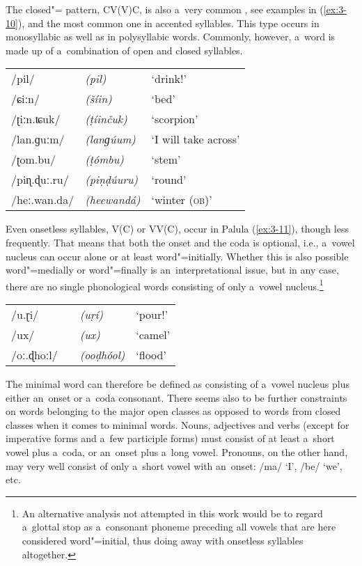 The closed"= pattern, CV(V)C, is also a~very common , see examples in (\ref{ex:3-10}), and the most common one in accented syllables. This type occurs in monosyllabic as well as in polysyllabic words. Commonly, however, a~word is made up of a~combination of open and closed syllables. 


\begin{exe}
\extab
\label{ex:3-10}
\begin{tabular}{ l l l }
/pil/ &
\textit{(pil)} &
`drink!' \\
/ɕiːn/ &
\textit{(\v{s}íin)} &
`bed'\\
/ʈiːn.ʨuk/ &
\textit{(ṭíinčuk)} &
`scorpion'\\
/lan.ɡuːm/ &
\textit{(lanɡúum)} &
`I will take across'\\
/ʈom.bu/ &
\textit{(ṭómbu)} &
`stem'\\
/piɳ.ɖuː.ru/ &
\textit{(piṇḍúuru)} &
`round'\\
/heː.wan.da/ &
\textit{(heewandá)} &
`winter (\textsc{ob)}'\\
\end{tabular}
\end{exe}


Even onsetless syllables, V(C) or VV(C), occur in Palula (\ref{ex:3-11}), though less frequently. That means that both the onset and the coda is optional, i.e., a~vowel nucleus can occur alone or at least word"=initially. Whether this is also possible word"=medially or word"=finally is an~interpretational issue, but in any case, there are no single phonological words consisting of only a~vowel nucleus.\footnote{An alternative analysis not attempted in this work would be to regard a~glottal stop as a~consonant phoneme preceding all vowels that are here considered word"=initial, thus doing away with onsetless syllables altogether.}


\begin{exe}
\extab
\label{ex:3-11}
\begin{tabular}{ l l l }
/u.ɽi/ &
\textit{(uṛí)} &
`pour!' \\
/ux/ &
\textit{(ux)} &
`camel'\\
/oː.ɖhoːl/\ \ &
\textit{(ooḍhóol)} &
`flood'\\
\end{tabular}
\end{exe}


The minimal word can therefore be defined as consisting of a~vowel nucleus plus either an~onset or a~coda consonant. There seems also to be further constraints on words belonging to the major open classes as opposed to words from closed classes when it comes to minimal words. Nouns, adjectives and verbs (except for imperative forms and a~few participle forms) must consist of at least a~short vowel plus a~coda, or an~onset plus a~long vowel. Pronouns, on the other hand, may very well consist of only a~short vowel with an~onset: /ma/ `I', /be/ `we', etc.


